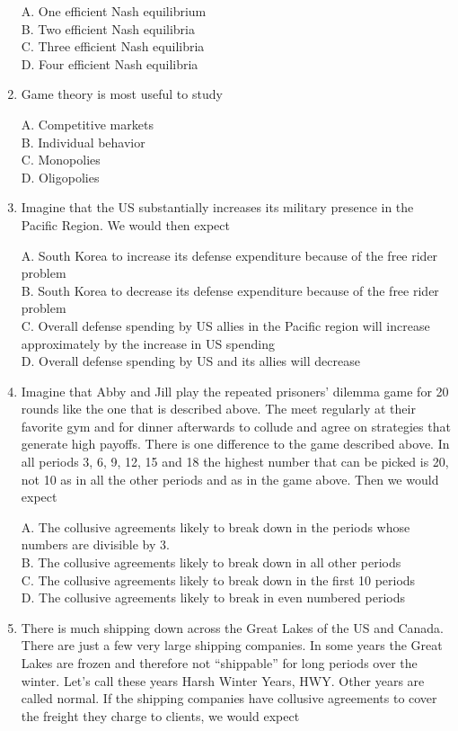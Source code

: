 \documentclass[
]{book}
\begin{document}
\begin{enumerate}
  A. One efficient Nash equilibrium\\
  B. Two efficient Nash equilibria\\
  C. Three efficient Nash equilibria\\
  D. Four efficient Nash equilibria
\item
  Game theory is most useful to study

  A. Competitive markets\\
  B. Individual behavior\\
  C. Monopolies\\
  D. Oligopolies
\item
  Imagine that the US substantially increases its military presence in the Pacific Region. We would then expect

  A. South Korea to increase its defense expenditure because of the free rider problem\\
  B. South Korea to decrease its defense expenditure because of the free rider problem\\
  C. Overall defense spending by US allies in the Pacific region will increase approximately by the increase in US spending\\
  D. Overall defense spending by US and its allies will decrease
\item
  Imagine that Abby and Jill play the repeated prisoners' dilemma game for 20 rounds like the one that is described above. The meet regularly at their favorite gym and for dinner afterwards to collude and agree on strategies that generate high payoffs. There is one difference to the game described above. In all periods 3, 6, 9, 12, 15 and 18 the highest number that can be picked is 20, not 10 as in all the other periods and as in the game above. Then we would expect

  A. The collusive agreements likely to break down in the periods whose numbers are divisible by 3.\\
  B. The collusive agreements likely to break down in all other periods\\
  C. The collusive agreements likely to break down in the first 10 periods\\
  D. The collusive agreements likely to break in even numbered periods
\item
  There is much shipping down across the Great Lakes of the US and Canada. There are just a few very large shipping companies. In some years the Great Lakes are frozen and therefore not ``shippable'' for long periods over the winter. Let's call these years Harsh Winter Years, HWY. Other years are called normal. If the shipping companies have collusive agreements to cover the freight they charge to clients, we would expect


\end{enumerate}
\end{document}

